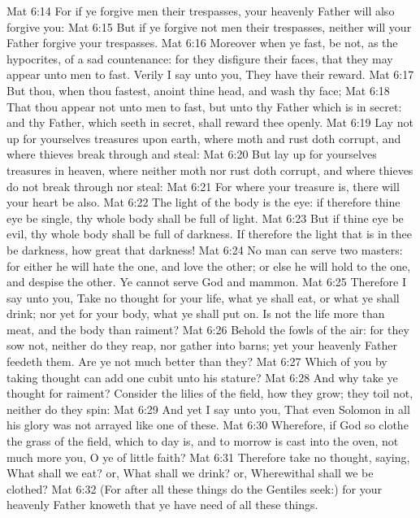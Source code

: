 \vs Mat 6:14 For if ye forgive men their trespasses, your heavenly Father will also forgive you:
\vs Mat 6:15 But if ye forgive not men their trespasses, neither will your Father forgive your trespasses.
\vs Mat 6:16 Moreover when ye fast, be not, as the hypocrites, of a sad countenance: for they disfigure their faces, that they may appear unto men to fast. Verily I say unto you, They have their reward.
\vs Mat 6:17 But thou, when thou fastest, anoint thine head, and wash thy face;
\vs Mat 6:18 That thou appear not unto men to fast, but unto thy Father which is in secret: and thy Father, which seeth in secret, shall reward thee openly.
\vs Mat 6:19 Lay not up for yourselves treasures upon earth, where moth and rust doth corrupt, and where thieves break through and steal:
\vs Mat 6:20 But lay up for yourselves treasures in heaven, where neither moth nor rust doth corrupt, and where thieves do not break through nor steal:
\vs Mat 6:21 For where your treasure is, there will your heart be also.
\vs Mat 6:22 The light of the body is the eye: if therefore thine eye be single, thy whole body shall be full of light.
\vs Mat 6:23 But if thine eye be evil, thy whole body shall be full of darkness. If therefore the light that is in thee be darkness, how great  that darkness!
\vs Mat 6:24 No man can serve two masters: for either he will hate the one, and love the other; or else he will hold to the one, and despise the other. Ye cannot serve God and mammon.
\vs Mat 6:25 Therefore I say unto you, Take no thought for your life, what ye shall eat, or what ye shall drink; nor yet for your body, what ye shall put on. Is not the life more than meat, and the body than raiment?
\vs Mat 6:26 Behold the fowls of the air: for they sow not, neither do they reap, nor gather into barns; yet your heavenly Father feedeth them. Are ye not much better than they?
\vs Mat 6:27 Which of you by taking thought can add one cubit unto his stature?
\vs Mat 6:28 And why take ye thought for raiment? Consider the lilies of the field, how they grow; they toil not, neither do they spin:
\vs Mat 6:29 And yet I say unto you, That even Solomon in all his glory was not arrayed like one of these.
\vs Mat 6:30 Wherefore, if God so clothe the grass of the field, which to day is, and to morrow is cast into the oven,  not much more  you, O ye of little faith?
\vs Mat 6:31 Therefore take no thought, saying, What shall we eat? or, What shall we drink? or, Wherewithal shall we be clothed?
\vs Mat 6:32 (For after all these things do the Gentiles seek:) for your heavenly Father knoweth that ye have need of all these things.
